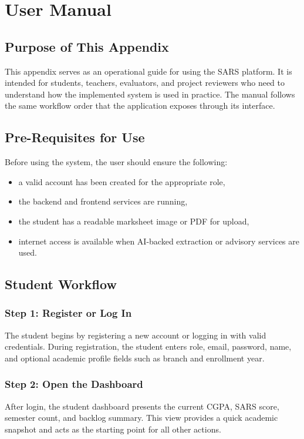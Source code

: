 \chapter{User Manual}

\section{Purpose of This Appendix}
This appendix serves as an operational guide for using the SARS platform. It is intended for students, teachers, evaluators, and project reviewers who need to understand how the implemented system is used in practice. The manual follows the same workflow order that the application exposes through its interface.

\section{Pre-Requisites for Use}
Before using the system, the user should ensure the following:
\begin{itemize}[leftmargin=*]
\item a valid account has been created for the appropriate role,
\item the backend and frontend services are running,
\item the student has a readable marksheet image or PDF for upload,
\item internet access is available when AI-backed extraction or advisory services are used.
\end{itemize}

\section{Student Workflow}
\subsection{Step 1: Register or Log In}
The student begins by registering a new account or logging in with valid credentials. During registration, the student enters role, email, password, name, and optional academic profile fields such as branch and enrollment year.

\subsection{Step 2: Open the Dashboard}
After login, the student dashboard presents the current CGPA, SARS score, semester count, and backlog summary. This view provides a quick academic snapshot and acts as the starting point for all other actions.

